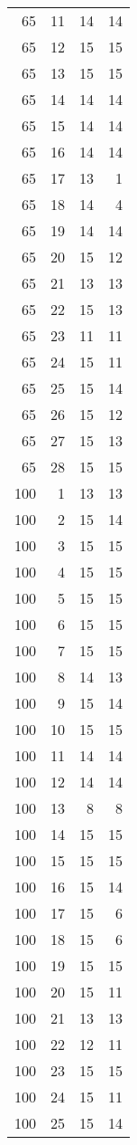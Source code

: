 \documentclass[
]{article}
\begin{document}
\begin{longtable}[]{@{}rrrr@{}}
65 & 11 & 14 & 14 \\
65 & 12 & 15 & 15 \\
65 & 13 & 15 & 15 \\
65 & 14 & 14 & 14 \\
65 & 15 & 14 & 14 \\
65 & 16 & 14 & 14 \\
65 & 17 & 13 & 1 \\
65 & 18 & 14 & 4 \\
65 & 19 & 14 & 14 \\
65 & 20 & 15 & 12 \\
65 & 21 & 13 & 13 \\
65 & 22 & 15 & 13 \\
65 & 23 & 11 & 11 \\
65 & 24 & 15 & 11 \\
65 & 25 & 15 & 14 \\
65 & 26 & 15 & 12 \\
65 & 27 & 15 & 13 \\
65 & 28 & 15 & 15 \\
100 & 1 & 13 & 13 \\
100 & 2 & 15 & 14 \\
100 & 3 & 15 & 15 \\
100 & 4 & 15 & 15 \\
100 & 5 & 15 & 15 \\
100 & 6 & 15 & 15 \\
100 & 7 & 15 & 15 \\
100 & 8 & 14 & 13 \\
100 & 9 & 15 & 14 \\
100 & 10 & 15 & 15 \\
100 & 11 & 14 & 14 \\
100 & 12 & 14 & 14 \\
100 & 13 & 8 & 8 \\
100 & 14 & 15 & 15 \\
100 & 15 & 15 & 15 \\
100 & 16 & 15 & 14 \\
100 & 17 & 15 & 6 \\
100 & 18 & 15 & 6 \\
100 & 19 & 15 & 15 \\
100 & 20 & 15 & 11 \\
100 & 21 & 13 & 13 \\
100 & 22 & 12 & 11 \\
100 & 23 & 15 & 15 \\
100 & 24 & 15 & 11 \\
100 & 25 & 15 & 14 \\

\end{longtable}
\end{document}
